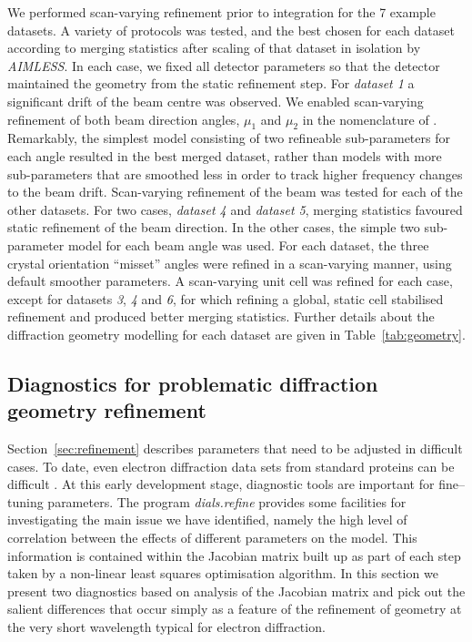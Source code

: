 \documentclass[preprint]{iucr}
\newcommand{\dialsrefine}{\emph{dials.refine}\xspace}
\newcommand{\aimless}{\emph{AIMLESS}\xspace}
\begin{document}
We performed scan-varying refinement prior to integration for the 7 example
datasets. A variety of protocols was tested, and the best chosen for each
dataset according to merging statistics after scaling of that dataset in
isolation by \aimless \cite{Evans2013}. In each case, we fixed all detector
parameters so that the detector maintained the geometry from the static
refinement step. For \emph{dataset 1} a significant drift of the beam centre
was observed. We enabled scan-varying refinement of both beam direction angles,
$\mu_1$ and $\mu_2$ in the nomenclature of .
Remarkably, the simplest model consisting of two refineable sub-parameters for
each angle resulted in the best merged dataset, rather than models with more
sub-parameters that are smoothed less in order to track higher frequency
changes to the beam drift. Scan-varying refinement of the beam was tested for
each of the other datasets. For two cases, \emph{dataset 4} and
\emph{dataset 5}, merging statistics favoured static refinement of the beam
direction. In the other cases, the simple two sub-parameter model for each
beam angle was used. For each dataset, the three crystal orientation ``misset''
angles were refined in a scan-varying manner, using default smoother parameters.
A scan-varying unit cell was refined for each case, except for datasets
\emph{3}, \emph{4} and \emph{6}, for which refining a global, static cell
stabilised refinement and produced better merging statistics.
Further details about the diffraction geometry modelling for each dataset
are given in Table~\ref{tab:geometry}.


\subsection{Diagnostics for problematic diffraction geometry refinement
\label{sec:diag}}

Section~\ref{sec:refinement} describes parameters that need to be adjusted in
difficult cases. To date, even electron diffraction data sets from standard
proteins can be difficult \cite{Clabbers2017,Hattne2015}. At this early
development stage, diagnostic tools are important for fine--tuning parameters.
The program \dialsrefine provides some facilities for investigating the main
issue we have identified, namely the high level of correlation between the
effects of different parameters on the model. This information is contained
within the Jacobian matrix built up as part of each step taken by a non-linear
least squares optimisation algorithm. In this section we present two
diagnostics based on analysis of the Jacobian matrix and pick out the salient
differences that occur simply as a feature of the refinement of geometry at the
very short wavelength typical for electron diffraction.
\end{document}
